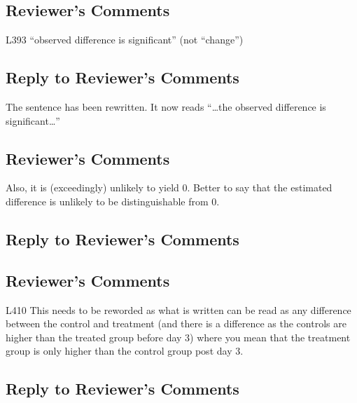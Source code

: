 \documentclass[
]{article}
\begin{document}
\hypertarget{reviewers-comments-31}{%
\subsection{Reviewer's Comments}\label{reviewers-comments-31}}

L393 ``observed difference is significant'' (not ``change'')

\hypertarget{section-31}{%
\subsection{\texorpdfstring{\textcolor{reviewersblue} {Reply to Reviewer's Comments}}{}}\label{section-31}}

The sentence has been rewritten. It now reads ``\ldots the observed difference is significant\ldots{}''

\hypertarget{reviewers-comments-32}{%
\subsection{Reviewer's Comments}\label{reviewers-comments-32}}

Also, it is (exceedingly) unlikely to yield 0. Better to say that the estimated difference is unlikely to be distinguishable from 0.

\hypertarget{section-32}{%
\subsection{\texorpdfstring{\textcolor{reviewersblue} {Reply to Reviewer's Comments}}{}}\label{section-32}}

\hypertarget{reviewers-comments-33}{%
\subsection{Reviewer's Comments}\label{reviewers-comments-33}}

L410 This needs to be reworded as what is written can be read as any difference between the control and treatment (and there is a difference as the controls are higher than the treated group before day 3) where you mean that the treatment group is only higher than the control group post day 3.

\hypertarget{section-33}{%
\subsection{\texorpdfstring{\textcolor{reviewersblue} {Reply to Reviewer's Comments}}{}}\label{section-33}}
\end{document}
